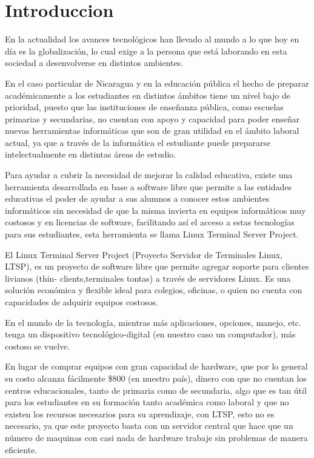 \documentclass[12pt]{report}
\begin{document}
\pagestyle{myheadings}
\section{Introduccion}
En la actualidad los avances tecnol\'ogicos han llevado al mundo a lo que hoy en día es la globalizaci\'on, lo cual exige a la persona que est\'a 
laborando en esta sociedad a desenvolverse en distintos ambientes. 

En el caso particular de Nicaragua y en la educaci\'on p\'ublica el hecho de preparar 
acad\'emicamente a los estudiantes en distintos \'ambitos tiene un nivel bajo de prioridad, puesto que las instituciones de enseñanza p\'ublica, como 
escuelas primarias y secundarias, no cuentan con apoyo y capacidad para poder enseñar nuevas herramientas inform\'aticas que son de gran utilidad en 
el \'ambito laboral actual, ya que a trav\'es de la inform\'atica el estudiante puede prepararse intelectualmente en distintas \'areas de estudio. 

Para ayudar a cubrir la necesidad de mejorar la calidad educativa, existe una herramienta desarrollada en base a software libre que permite a las 
entidades educativas el poder de ayudar a sus alumnos a conocer estos ambientes inform\'aticos sin necesidad de que la misma invierta en equipos 
inform\'aticos muy costosos y en licencias de software, facilitando así el acceso a estas tecnolog\'ias para sus estudiantes, esta herramienta se 
llama Linux Terminal Server Project. 

El Linux Terminal Server Project (Proyecto Servidor de Terminales Linux, LTSP), es un proyecto de software libre que permite agregar soporte para 
clientes livianos (thin- clients,terminales tontas) a trav\'es de servidores Linux. Es una soluci\'on econ\'omica y flexible ideal para colegios, 
oficinas, o quien no cuenta con capacidades de adquirir equipos costosos. 

En el mundo de la tecnolog\'ia, mientras m\'as aplicaciones, opciones, manejo, etc. tenga un dispositivo tecnol\'ogico-digital (en nuestro caso un 
computador), m\'as costoso se vuelve. 

En lugar de comprar equipos con gran capacidad de hardware, que por lo general su costo alcanza f\'acilmente \$800 (en nuestro pa\'is), dinero con 
que no cuentan los centros educacionales, tanto de primaria como de secundaria, algo que es tan \'util para los estudiantes en su formaci\'on tanto 
acad\'emica como laboral y que no existen los recursos necesarios para su aprendizaje, con LTSP, esto no es necesario, ya que este proyecto basta 
con un servidor central que hace que un n\'umero de maquinas con casi nada de hardware trabaje sin problemas de manera eficiente. 
\end{document}
